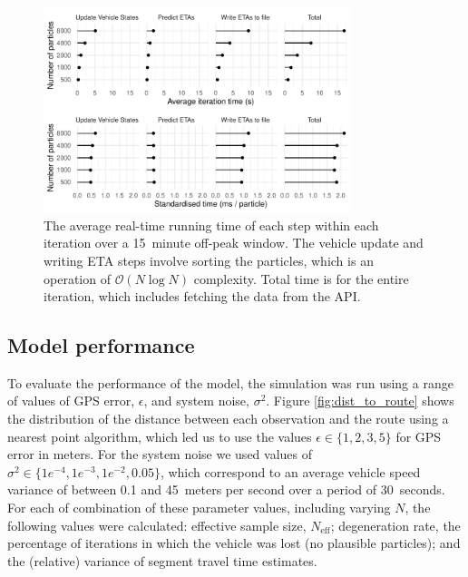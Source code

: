\begin{figure}[tb]
    \centering
    \includegraphics[width=0.8\textwidth]{figures/04_model_results_timing.pdf}
    \caption{
        The average real-time running time of each step within each iteration
        over a 15~minute off-peak window.
        The vehicle update and writing ETA steps involve sorting the particles,
        which is an operation of $\mathcal{O}(N\log N)$ complexity.
        Total time is for the entire iteration, which includes fetching the data from the API.
    }
    \label{fig:timings}
\end{figure}




\subsection{Model performance}
\label{sec:model_perf}


To evaluate the performance of the model,
the simulation was run using a range of values of GPS error, $\epsilon$,
and system noise, $\sigma^2$.
Figure \ref{fig:dist_to_route} shows the distribution of the distance
between each observation and the route using a nearest point algorithm,
which led us to use the values $\epsilon \in \{1,2,3,5\}$ for GPS error in meters.
For the system noise we used values of $\sigma^2\in \{1e^{-4},1e^{-3},1e^{-2},0.05\}$,
which correspond to an average vehicle speed variance of between 0.1 and 45~meters per second
over a period of 30~seconds.
For each of combination of these parameter values, including varying $N$,
the following values were calculated:
effective sample size, $N_\text{eff}$;
degeneration rate, the percentage of iterations in which the vehicle was lost
(no plausible particles);
and the (relative) variance of segment travel time estimates.


